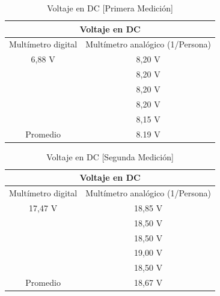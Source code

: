 \documentclass[letterpaper, 12pt]{report}
\begin{document}

\begin{table}[H]
	\begin{center}
		\begin{tabular}{|c|c|}
			\multicolumn{2}{c}{Voltaje en DC}                     \\ \hline
			Multímetro digital & Multímetro analógico (1/Persona) \\ \hline
			6,88 V             & 8,20 V                           \\
			                   & 8,20 V                           \\
			                   & 8,20 V                           \\
			                   & 8,20 V                           \\
			                   & 8,15 V                           \\ \hline
			Promedio           & 8.19 V                           \\ \hline
		\end{tabular}
		\caption{Voltaje en DC [Primera Medición]}
		\label{tab:voltajeDC_1}
	\end{center}
\end{table}

\begin{table}[H]
	\begin{center}
		\begin{tabular}{|c|c|}
			\multicolumn{2}{c}{Voltaje en DC}                     \\ \hline
			Multímetro digital & Multímetro analógico (1/Persona) \\ \hline
			17,47 V            & 18,85 V                          \\
			                   & 18,50 V                          \\
			                   & 18,50 V                          \\
			                   & 19,00 V                          \\
			                   & 18,50 V                          \\ \hline
			Promedio           & 18,67 V                          \\ \hline
		\end{tabular}
		\caption{Voltaje en DC [Segunda Medición]}
		\label{tab:voltajeDC_2}
	\end{center}
\end{table}
\end{document}
